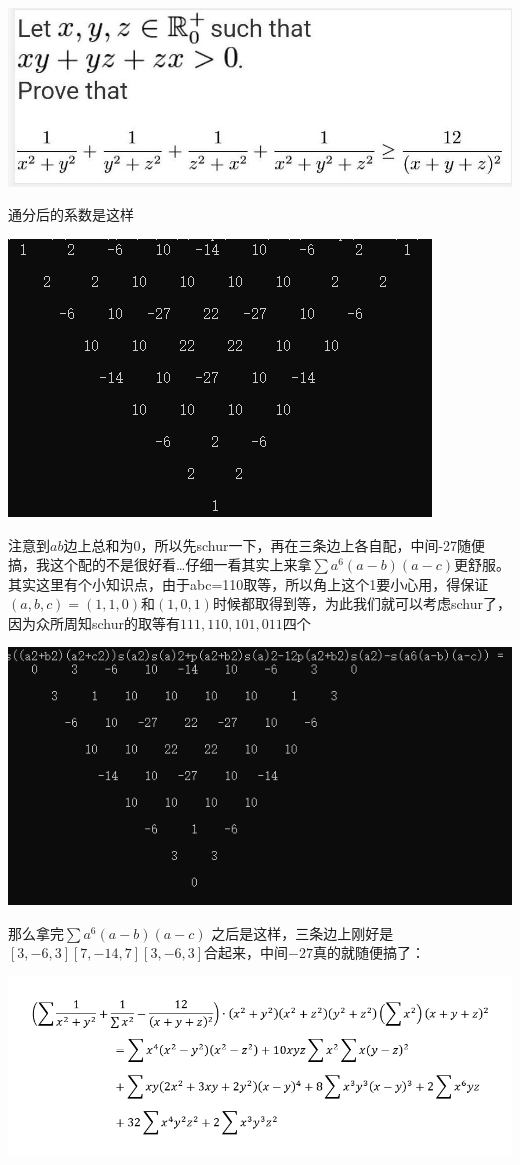 \documentclass[UTF8]{ctexart}
\begin{document}
\subsection{}
\begin{center}
	\includegraphics[width=0.6\linewidth]{a01}
\end{center}
通分后的系数是这样
\begin{center}
	\includegraphics[width=0.7\linewidth]{a03}
\end{center}
注意到$ ab $边上总和为0，所以先schur一下，再在三条边上各自配，中间-27随便搞，我这个配的不是很好看…仔细一看其实上来拿$  \displaystyle \sum a^{6}(a-b)(a-c) $更舒服。其实这里有个小知识点，由于abc=110取等，所以角上这个1要小心用，得保证$ (a,b,c)=(1,1,0) $和$ (1,0,1) $时候都取得到等，为此我们就可以考虑schur了，因为众所周知schur的取等有$ 111,110,101,011 $四个
\begin{center}
	\includegraphics[width=0.7\linewidth]{a04}
\end{center}
那么拿完$  \displaystyle \sum a^{6}(a-b)(a-c) $ 之后是这样，三条边上刚好是$ [3,-6,3][7,-14,7][3,-6,3] $合起来，中间$ -27 $真的就随便搞了：
\begin{center}
	\includegraphics[width=0.7\linewidth]{a02}
\end{center}
\end{document}
